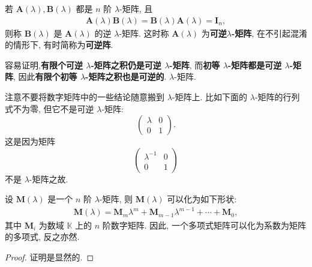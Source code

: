 \documentclass[../../main.tex]{subfiles}
\begin{document}
\begin{definition}[可逆$\lambda$-矩阵]
若 $\boldsymbol{A}(\lambda),\boldsymbol{B}(\lambda)$ 都是 $n$ 阶 $\lambda$-矩阵, 且
\begin{align*}
\boldsymbol{A}(\lambda)\boldsymbol{B}(\lambda)=\boldsymbol{B}(\lambda)\boldsymbol{A}(\lambda)=\boldsymbol{I}_n,
\end{align*}
则称 $\boldsymbol{B}(\lambda)$ 是 $\boldsymbol{A}(\lambda)$ 的逆 $\lambda$-矩阵. 这时称 $\boldsymbol{A}(\lambda)$ 为\textbf{可逆$\lambda$-矩阵}, 在不引起混淆的情形下, 有时简称为\textbf{可逆阵}. 
\end{definition}
\begin{note}
容易证明,\textbf{有限个可逆 $\lambda$-矩阵之积仍是可逆 $\lambda$-矩阵}, 而\textbf{初等 $\lambda$-矩阵都是可逆 $\lambda$-矩阵}, 因此\textbf{有限个初等 $\lambda$-矩阵之积也是可逆的}. $\lambda$-矩阵.  
\end{note}
\begin{remark}
注意不要将数字矩阵中的一些结论随意搬到 $\lambda$-矩阵上. 比如下面的 $\lambda$-矩阵的行列式不为零, 但它不是可逆 $\lambda$-矩阵:
\[
\begin{pmatrix}
\lambda & 0 \\
0 & 1
\end{pmatrix}.
\]
这是因为矩阵
\[
\begin{pmatrix}
\lambda^{-1} & 0 \\
0 & 1
\end{pmatrix}
\]
不是 $\lambda$-矩阵之故. 
\end{remark}

\begin{lemma}
设 $\boldsymbol{M}(\lambda)$ 是一个 $n$ 阶 $\lambda$-矩阵, 则 $\boldsymbol{M}(\lambda)$ 可以化为如下形状:
\begin{align*}
\boldsymbol{M}(\lambda)=\boldsymbol{M}_m\lambda^m+\boldsymbol{M}_{m - 1}\lambda^{m - 1}+\cdots+\boldsymbol{M}_0,
\end{align*}
其中 $\boldsymbol{M}_i$ 为数域 $\mathbb{K}$ 上的 $n$ 阶数字矩阵. 因此, 一个多项式矩阵可以化为系数为矩阵的多项式, 反之亦然. 
\end{lemma}
\begin{proof}
证明是显然的.

\end{proof}
\end{document}
